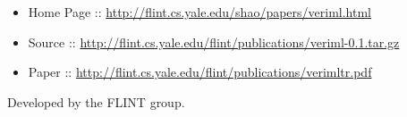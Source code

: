 \documentclass[12pt,twoside]{article}
\begin{document}
\begin{itemize}[noitemsep,topsep=\mdcompacttopsep]%

\item{}Home Page :: \href{http://flint.cs.yale.edu/shao/papers/veriml.html}{{\ttfamily http://\hspace{0pt}flint.\hspace{0pt}cs.\hspace{0pt}yale.\hspace{0pt}edu/\hspace{0pt}shao/\hspace{0pt}papers/\hspace{0pt}veriml.\hspace{0pt}html}}%

\item{}Source :: \href{http://flint.cs.yale.edu/flint/publications/veriml-0.1.tar.gz}{{\ttfamily http://\hspace{0pt}flint.\hspace{0pt}cs.\hspace{0pt}yale.\hspace{0pt}edu/\hspace{0pt}flint/\hspace{0pt}publications/\hspace{0pt}veriml-\hspace{0pt}0.\hspace{0pt}1.\hspace{0pt}tar.\hspace{0pt}gz}}%

\item{}Paper :: \href{http://flint.cs.yale.edu/flint/publications/verimltr.pdf}{{\ttfamily http://\hspace{0pt}flint.\hspace{0pt}cs.\hspace{0pt}yale.\hspace{0pt}edu/\hspace{0pt}flint/\hspace{0pt}publications/\hspace{0pt}verimltr.\hspace{0pt}pdf}}%
\end{itemize}%

\noindent{}Developed by the FLINT group.%
\end{document}

